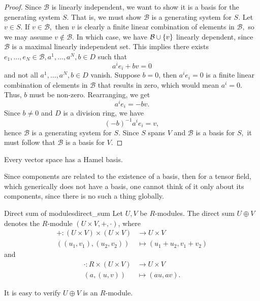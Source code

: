 \begin{proof}
    Since \(\mathcal{B}\) is linearly independent, we want to show it is a basis for the generating system \(S\). That is, we must show \(\mathcal{B}\) is a generating system for \(S\). Let \(v \in S\). If \(v \in \mathcal{B},\) then \(v\) is clearly a finite linear combination of elements in \(\mathcal{B},\) so we may assume \(v \notin \mathcal{B}\). In which case, we have \(\mathcal{B} \cup \{v\}\) linearly dependent, since \(\mathcal{B}\) is a maximal linearly independent set. This implies there exists \(e_1, \dots, e_N \in \mathcal{B}, a^1, \dots, a^N, b \in D\) such that
    \begin{equation*}
        a^i e_i + bv = 0
    \end{equation*}
    and not all \(a^1, \dots, a^N, b \in D\) vanish. Suppose \(b = 0\), then \(a^ie_i = 0\) is a finite linear combination of elements in \(\mathcal{B}\) that results in zero, which would mean \(a^i = 0\). Thus, \(b\) must be non-zero. Rearranging, we get
    \begin{equation*}
        a^i e_i = -b v.
    \end{equation*}
    Since \(b \neq 0\) and \(D\) is a division ring, we have
    \begin{equation*}
        (-b)^{-1} a^i e_i  = v,
    \end{equation*}
    hence \(\mathcal{B}\) is a generating system for \(S\). Since \(S\) spans \(V\) and \(\mathcal{B}\) is a basis for \(S,\) it must follow that \(\mathcal{B}\) is a basis for \(V\).
\end{proof}
\begin{corollary}
    Every vector space has a Hamel basis.
\end{corollary}

Since components are related to the existence of a basis, then for a tensor field, which generically does not have a basis, one cannot think of it only about its components, since there is no such a thing globally.

\begin{definition}{Direct sum of modules}{direct_sum}
    Let \(U, V\) be \(R\)-modules. The direct sum \(U \oplus V\) denotes the \(R\)-module \((U \times V, +, \cdot)\), where
    \begin{align*}
        + : (U \times V) \times (U \times V) &\to U \times V\\
        \left((u_1, v_1), (u_2, v_2)\right) &\mapsto (u_1 + u_2, v_1 + v_2)
    \end{align*}
    and
    \begin{align*}
        \cdot : R \times (U \times V) &\to U \times V\\
        \left(a, (u, v)\right) &\mapsto (au, av).
    \end{align*}
\end{definition}
\begin{remark}
    It is easy to verify \(U \oplus V\) is an \(R\)-module.
\end{remark}

